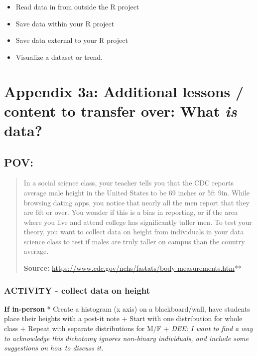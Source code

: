 \documentclass[
]{book}
\providecommand{\tightlist}{%
  \setlength{\itemsep}{0pt}\setlength{\parskip}{0pt}}
\begin{document}
\begin{itemize}
\tightlist
\item
  Read data in from outside the R project
\item
  Save data within your R project
\item
  Save data external to your R project
\item
  Visualize a dataset or trend.
\end{itemize}

\hypertarget{appendix-3a-additional-lessons-content-to-transfer-over-what-is-data}{%
\chapter*{\texorpdfstring{Appendix 3a: Additional lessons / content to transfer over: What \emph{is} data?}{Appendix 3a: Additional lessons / content to transfer over: What is data?}}\label{appendix-3a-additional-lessons-content-to-transfer-over-what-is-data}}

\hypertarget{pov}{%
\section*{POV:}\label{pov}}

\begin{quote}
In a social science class, your teacher tells you that the CDC
reports average male height in the United States to be 69
inches or 5ft 9in. While browsing dating apps, you notice that
nearly all the men report that they are 6ft or over. You wonder
if this is a bias in reporting, or if the area where you live
and attend college has significantly taller men. To test your
theory, you want to collect data on height from individuals in
your data science class to test if males are truly taller on campus
than the country average.

\textbf{Source:} \url{https://www.cdc.gov/nchs/fastats/body-measurements.htm}**
\end{quote}

\hypertarget{activity---collect-data-on-height}{%
\subsection{ACTIVITY - collect data on height}\label{activity---collect-data-on-height}}

\textbf{If in-person}
* Create a histogram (x axis) on a blackboard/wall, have students place their heights
with a post-it note
+ Start with one distribution for whole class
+ Repeat with separate distributions for M/F
+ \emph{DEE: I want to find a way to acknowledge this dichotomy ignores non-binary individuals, and include some suggestions on how to discuss it.}
\end{document}
